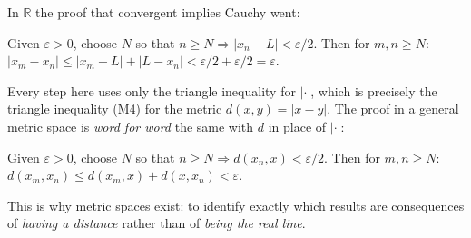 \begin{example}
\label{ex:convergent-implies-cauchy-port}
In $\mathbb{R}$ the proof that convergent implies Cauchy went:

\medskip
Given $\varepsilon > 0$, choose $N$ so that $n \ge N \Rightarrow |x_n - L| < \varepsilon/2$.
Then for $m, n \ge N$: $|x_m - x_n| \le |x_m - L| + |L - x_n| < \varepsilon/2 + \varepsilon/2 = \varepsilon$.

\medskip
\noindent
Every step here uses only the triangle inequality for $|\cdot|$,
which is precisely the triangle inequality (M4) for the metric $d(x,y) = |x-y|$.
The proof in a general metric space is \emph{word for word} the same with $d$ in
place of $|\cdot|$:

\medskip
Given $\varepsilon > 0$, choose $N$ so that $n \ge N \Rightarrow d(x_n, x) < \varepsilon/2$.
Then for $m, n \ge N$: $d(x_m, x_n) \le d(x_m, x) + d(x, x_n) < \varepsilon$.

\medskip
\noindent
This is why metric spaces exist: to identify exactly which results
are consequences of \emph{having a distance} rather than of
\emph{being the real line}.
\end{example}

